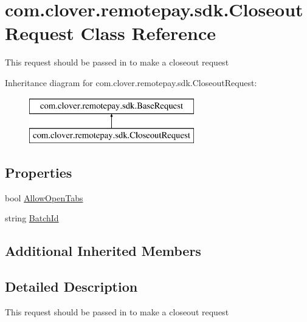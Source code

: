 \hypertarget{classcom_1_1clover_1_1remotepay_1_1sdk_1_1_closeout_request}{}\section{com.\+clover.\+remotepay.\+sdk.\+Closeout\+Request Class Reference}
\label{classcom_1_1clover_1_1remotepay_1_1sdk_1_1_closeout_request}


This request should be passed in to make a closeout request  


Inheritance diagram for com.\+clover.\+remotepay.\+sdk.\+Closeout\+Request\+:\begin{figure}[H]
\begin{center}
\leavevmode
\includegraphics[height=2.000000cm]{classcom_1_1clover_1_1remotepay_1_1sdk_1_1_closeout_request}
\end{center}
\end{figure}
\subsection*{Properties}
\begin{DoxyCompactItemize}
\item 
bool \hyperlink{classcom_1_1clover_1_1remotepay_1_1sdk_1_1_closeout_request_a8cbc459862243fa018d02950986558c5}{Allow\+Open\+Tabs}
\item 
string \hyperlink{classcom_1_1clover_1_1remotepay_1_1sdk_1_1_closeout_request_ae6da5f308304ac9d89dc3f1d6adac939}{Batch\+Id}
\end{DoxyCompactItemize}
\subsection*{Additional Inherited Members}


\subsection{Detailed Description}
This request should be passed in to make a closeout request 



